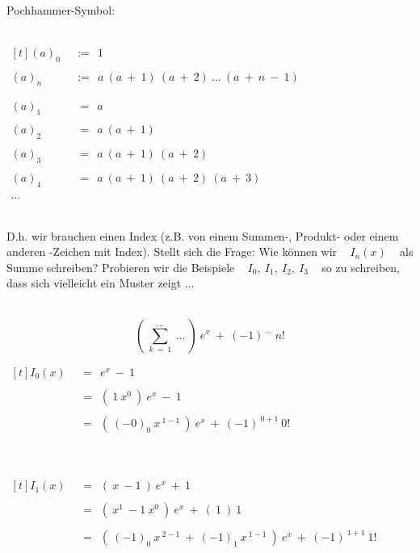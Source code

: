 	
	~\\ Pochhammer-Symbol:
	
	~\\
	
	$\begin{aligned}[t]
	(a)_0 ~~ &:= ~~ 1 \\ \\
	(a)_n ~~ &:= ~~ a ~ (a ~ + ~ 1) ~ (a ~ + ~ 2) ~ ... ~ (a ~ + ~ n ~ - ~ 1) \\ \\ \\
	(a)_1 ~~ &~= ~~ a \\ \\
	(a)_2 ~~ &~= ~~ a ~ (a ~ + ~ 1) \\ \\
	(a)_3 ~~ &~= ~~ a ~ (a ~ + ~ 1) ~ (a ~ + ~ 2) \\ \\
	(a)_4 ~~ &~= ~~ a ~ (a ~ + ~ 1) ~ (a ~ + ~ 2) ~ (a ~ + ~ 3) \\ \\
	...
	\end{aligned}$

	~\\
	
	D.h. wir brauchen einen Index (z.B. von einem Summen-, Produkt- oder einem anderen -Zeichen mit Index). Stellt sich die Frage: Wie können wir ~ $I_n(x)$ ~ als Summe schreiben? Probieren wir die Beispiele ~ $I_0, ~ I_1, ~ I_2, ~ I_3$ ~ so zu schreiben, dass sich vielleicht ein Muster zeigt ...
	
	~\\
	
	\[ \left( ~ \sum_{k ~ = ~ 1}^{...} ~ ... ~ \right) ~ e^x ~ + ~ (-1)^{~ ...} ~ n! \]
	
	
	\newpage	

	$\begin{aligned}[t]
	I_0(x) ~~ &= ~~ e^x ~ - ~ 1 \\ \\
	&= ~~ \left( ~ 1 ~ x^0 ~ \right) ~ e^x ~ - ~ 1 \\ \\
	&= ~~ \left( ~ (-0)_0 ~ x^{~ 1 - 1} ~ \right) ~ e^x ~ + ~ \left( -1 \right)^{~ 0 + 1} ~ 0!
	\end{aligned}$
	
	~\\~\\
	
	$\begin{aligned}[t]
	I_1(x) ~~ &= ~~ \left( ~ x ~ - 1 ~ \right) ~ e^x ~ + ~ 1 \\ \\
	&= ~~ \left( ~ x^1 ~ - 1 ~ x^0 ~ \right) ~ e^x ~ + ~ \left( ~ 1 ~ \right) ~ 1 \\ \\
	&= ~~ \left( ~ (-1)_0 ~ x^{~ 2 - 1} ~ + ~ (-1)_1 ~ x^{~ 1 - 1} ~ \right) ~ e^x ~ + ~ \left( -1 \right)^{~ 1 + 1} ~ 1!
	\end{aligned}$
	
